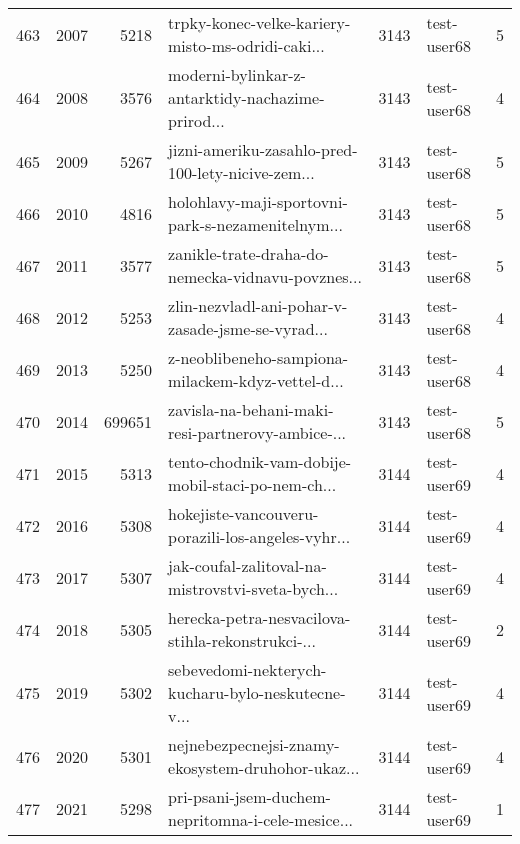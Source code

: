 \begin{tabular}{lrrlrlr}
463  &       2007 &     5218 &  trpky-konec-velke-kariery-misto-ms-odridi-caki... &     3143 &                  test-user68 &               5 \\
464  &       2008 &     3576 &  moderni-bylinkar-z-antarktidy-nachazime-prirod... &     3143 &                  test-user68 &               4 \\
465  &       2009 &     5267 &  jizni-ameriku-zasahlo-pred-100-lety-nicive-zem... &     3143 &                  test-user68 &               5 \\
466  &       2010 &     4816 &  holohlavy-maji-sportovni-park-s-nezamenitelnym... &     3143 &                  test-user68 &               5 \\
467  &       2011 &     3577 &  zanikle-trate-draha-do-nemecka-vidnavu-povznes... &     3143 &                  test-user68 &               5 \\
468  &       2012 &     5253 &  zlin-nezvladl-ani-pohar-v-zasade-jsme-se-vyrad... &     3143 &                  test-user68 &               4 \\
469  &       2013 &     5250 &  z-neoblibeneho-sampiona-milackem-kdyz-vettel-d... &     3143 &                  test-user68 &               4 \\
470  &       2014 &   699651 &  zavisla-na-behani-maki-resi-partnerovy-ambice-... &     3143 &                  test-user68 &               5 \\
471  &       2015 &     5313 &  tento-chodnik-vam-dobije-mobil-staci-po-nem-ch... &     3144 &                  test-user69 &               4 \\
472  &       2016 &     5308 &  hokejiste-vancouveru-porazili-los-angeles-vyhr... &     3144 &                  test-user69 &               4 \\
473  &       2017 &     5307 &  jak-coufal-zalitoval-na-mistrovstvi-sveta-bych... &     3144 &                  test-user69 &               4 \\
474  &       2018 &     5305 &  herecka-petra-nesvacilova-stihla-rekonstrukci-... &     3144 &                  test-user69 &               2 \\
475  &       2019 &     5302 &  sebevedomi-nekterych-kucharu-bylo-neskutecne-v... &     3144 &                  test-user69 &               4 \\
476  &       2020 &     5301 &  nejnebezpecnejsi-znamy-ekosystem-druhohor-ukaz... &     3144 &                  test-user69 &               4 \\
477  &       2021 &     5298 &  pri-psani-jsem-duchem-nepritomna-i-cele-mesice... &     3144 &                  test-user69 &               1 \\

\end{tabular}
